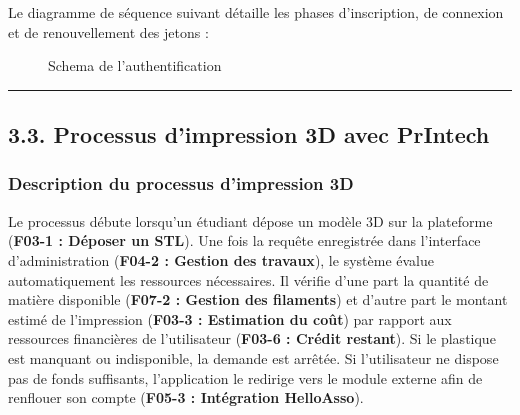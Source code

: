 Le diagramme de séquence suivant détaille les phases d'inscription, de
connexion et de renouvellement des jetons :

\begin{figure}
\centering

\caption{Schema de l'authentification}
\end{figure}

\begin{center}\rule{0.5\linewidth}{0.5pt}\end{center}

\newpage

\hypertarget{processus-dimpression-3d-avec-printech}{%
\subsection{3.3. Processus d'impression 3D avec
PrIntech}\label{processus-dimpression-3d-avec-printech}}

\hypertarget{description-du-processus-dimpression-3d}{%
\subsubsection{Description du processus d'impression
3D}\label{description-du-processus-dimpression-3d}}

Le processus débute lorsqu'un étudiant dépose un modèle 3D sur la
plateforme (\textbf{F03-1 : Déposer un STL}). Une fois la requête
enregistrée dans l'interface d'administration (\textbf{F04-2 : Gestion
des travaux}), le système évalue automatiquement les ressources
nécessaires. Il vérifie d'une part la quantité de matière disponible
(\textbf{F07-2 : Gestion des filaments}) et d'autre part le montant
estimé de l'impression (\textbf{F03-3 : Estimation du coût}) par rapport
aux ressources financières de l'utilisateur (\textbf{F03-6 : Crédit
restant}). Si le plastique est manquant ou indisponible, la demande est
arrêtée. Si l'utilisateur ne dispose pas de fonds suffisants,
l'application le redirige vers le module externe afin de renflouer son
compte (\textbf{F05-3 : Intégration HelloAsso}).

